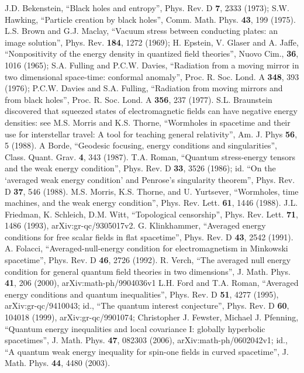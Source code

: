 \documentclass[11pt]{article}
\begin{document}
\begin{thebibliography}{99}
J.D. Bekenstein, ``Black holes and entropy'', Phys. Rev. D \textbf{7}, 2333 (1973); S.W. Hawking, ``Particle creation by black holes'', Comm. Math. Phys. \textbf{43}, 199 (1975).
L.S. Brown and G.J. Maclay, ``Vacuum stress between conducting plates: an image solution'', Phys. Rev. \textbf{184}, 1272 (1969); 
H. Epstein, V. Glaser and A. Jaffe, ``Nonpositivity of the energy density in quantized field theories'', Nuovo Cim., \textbf{36}, 1016 (1965); S.A. Fulling and P.C.W. Davies, ``Radiation from a moving mirror in two dimensional space-time: conformal anomaly'', Proc. R. Soc. Lond. A \textbf{348}, 393 (1976); P.C.W. Davies and S.A. Fulling, ``Radiation from moving mirrors and from black holes'', Proc. R. Soc. Lond. A \textbf{356}, 237 (1977).  S.L. Braunstein discovered that squeezed states of electromagnetic fields can have negative energy densities: see M.S. Morris and K.S. Thorne, ``Wormholes in spacetime and their use for interstellar travel: A tool for teaching general relativity'', Am. J. Phys \textbf{56}, 5 (1988).
A Borde, ``Geodesic focusing, energy conditions and singularities'', Class. Quant. Grav. \textbf{4}, 343 (1987).
 T.A. Roman, ``Quantum stress-energy tensors and the weak energy condition'', Phys. Rev. D \textbf{33}, 3526 (1986); id. ``On the `averaged weak energy condition' and Penrose's singularity theorem'', Phys. Rev. D \textbf{37}, 546 (1988).
M.S. Morris, K.S. Thorne, and U. Yurtsever, ``Wormholes, time machines, and the weak energy condition'', Phys. Rev. Lett. \textbf{61}, 1446 (1988).
J.L. Friedman, K. Schleich, D.M. Witt, ``Topological censorship'', Phys. Rev. Lett. \textbf{71}, 1486 (1993), arXiv:gr-qc/9305017v2.
G. Klinkhammer, ``Averaged energy conditions for free scalar fields in flat spacetime'', Phys. Rev. D \textbf{43}, 2542 (1991).
A. Folacci, ``Averaged-null-energy condition for electromagnetism in Min\-kow\-ski spacetime'', Phys. Rev. D \textbf{46}, 2726 (1992).
R. Verch, ``The averaged null energy condition for general quantum field theories in two dimensions'', J. Math. Phys. \textbf{41}, 206 (2000), arXiv:math-ph/9904036v1
L.H. Ford and T.A. Roman, ``Averaged energy conditions and quantum inequalities'', Phys. Rev. D \textbf{51}, 4277 (1995), arXiv:gr-qc/9410043; id., ``The quantum interest conjecture'', Phys. Rev. D \textbf{60}, 104018 (1999), arXiv:gr-qc/9901074;  Christopher J. Fewster, Michael J. Pfenning, ``Quantum energy inequalities and local covariance I: globally hyperbolic spacetimes'', J. Math. Phys. \textbf{47}, 082303 (2006), arXiv:math-ph/0602042v1; id., ``A quantum weak energy inequality for spin-one fields in curved spacetime'', J. Math. Phys. \textbf{44}, 4480 (2003).

\end{thebibliography}
\end{document}
